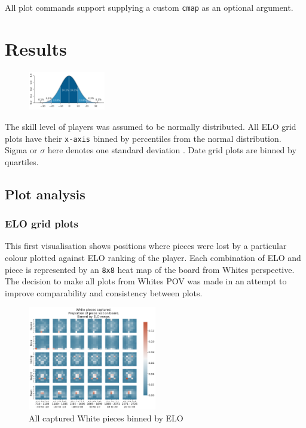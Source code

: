 \documentclass[11pt]{article}
\begin{document}
All plot commands support supplying a custom \texttt{cmap} as an optional argument.
\section{Results}
\label{sec:orgf2cbabf}
\begin{figure}
\centering
\includegraphics[width=0.3\textwidth]{Images/1920px-Standard_deviation_diagram.png}
\end{figure}
The skill level of players was assumed to be normally distributed. All ELO grid plots have their \texttt{x-axis} binned by percentiles from the normal distribution. Sigma or \(\sigma\) here denotes one standard deviation \cite{NormalDist}.
Date grid plots are binned by quartiles.

\subsection{Plot analysis}
\label{sec:orgca38cc4}
\subsubsection{ELO grid plots}
\label{sec:org3b244b5}
This first visualisation shows positions where pieces were lost by a particular colour plotted against ELO ranking of the player. Each combination of ELO and piece is represented by an \texttt{8x8} heat map of the board from Whites perspective. The decision to make all plots from Whites POV was made in an attempt to improve comparability and consistency between plots.
\begin{figure}
\centering
\includegraphics[width=0.5\textwidth]{Images/_HEATMAP_Queen_Rook_Bishop_Knight_Pawn_WHITE_ELO_FISC.png}
\caption{All captured White pieces binned by ELO}
\end{figure}
\end{document}
